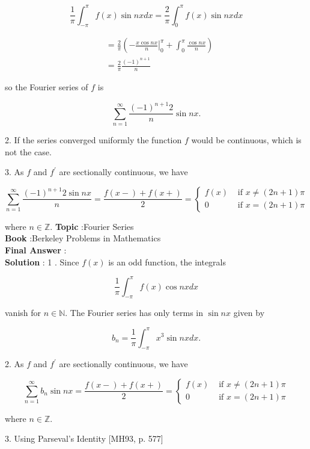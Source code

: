 \documentclass[10pt]{article}
\begin{document}
$$
\frac{1}{\pi} \int_{-\pi}^{\pi} f(x) \sin n x d x=\frac{2}{\pi} \int_{0}^{\pi} f(x) \sin n x d x
$$



$$
\begin{aligned}
&=\frac{2}{\pi}\left(-\left.\frac{x \cos n x}{n}\right|_{0} ^{\pi}+\int_{0}^{\pi} \frac{\cos n x}{n}\right) \\
&=\frac{2}{\pi} \frac{(-1)^{n+1}}{n}
\end{aligned}
$$

so the Fourier series of $f$ is

$$
\sum_{n=1}^{\infty} \frac{(-1)^{n+1} 2}{n} \sin n x .
$$

2. If the series converged uniformly the function $f$ would be continuous, which is not the case.

3. As $f$ and $f^{\prime}$ are sectionally continuous, we have

$$
\sum_{n=1}^{\infty} \frac{(-1)^{n+1} 2 \sin n x}{n}=\frac{f(x-)+f(x+)}{2}= \begin{cases}f(x) & \text { if } x \neq(2 n+1) \pi \\ 0 & \text { if } x=(2 n+1) \pi\end{cases}
$$

where $n \in \mathbb{Z}$.
\textbf{Topic} :Fourier Series \\
\textbf{Book} :Berkeley Problems in Mathematics\\
\textbf{Final Answer} :\\


\textbf{Solution} : 1 . Since $f(x)$ is an odd function, the integrals

$$
\frac{1}{\pi} \int_{-\pi}^{\pi} f(x) \cos n x d x
$$

vanish for $n \in \mathbb{N}$. The Fourier series has only terms in $\sin n x$ given by

$$
b_{n}=\frac{1}{\pi} \int_{-\pi}^{\pi} x^{3} \sin n x d x .
$$

2. As $f$ and $f^{\prime}$ are sectionally continuous, we have

$$
\sum_{n=1}^{\infty} b_{n} \sin n x=\frac{f(x-)+f(x+)}{2}= \begin{cases}f(x) & \text { if } x \neq(2 n+1) \pi \\ 0 & \text { if } x=(2 n+1) \pi\end{cases}
$$

where $n \in \mathbb{Z}$.

3. Using Parseval's Identity [MH93, p. 577]
\end{document}
